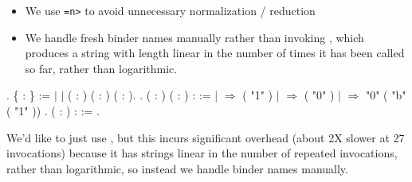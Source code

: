\begin{itemize}
\item  We use \verb|=n>| to avoid unnecessary normalization /
      reduction



\item  We handle fresh binder names manually rather than invoking
      , which produces a string with length
      linear in the number of times it has been called so far, rather
      than logarithmic. 
\end{itemize}
\begin{coqdoccode}
\coqdocemptyline
\coqdocnoindent
{} .\coqdoceol
\coqdocindent{1.00em}
  \{ : \} :=\coqdoceol
\coqdocindent{1.00em}
\ensuremath{|} \coqdoceol
\coqdocindent{1.00em}
\ensuremath{|}  ( : ) ( : ) ( : ).\coqdoceol
\coqdocnoindent
{} .\coqdoceol
\coqdocemptyline
\coqdocnoindent
{}  ( : ) ( : ) : \coqdoceol
\coqdocindent{1.00em}
:=   \coqdoceol
\coqdocindent{2.50em}
\ensuremath{|}   \ensuremath{\Rightarrow}   ( "1" )\coqdoceol
\coqdocindent{2.50em}
\ensuremath{|}   \ensuremath{\Rightarrow}   ( "0" )\coqdoceol
\coqdocindent{2.50em}
\ensuremath{|}  \ensuremath{\Rightarrow}  "0" ( "b" ( "1" ))\coqdoceol
\coqdocindent{2.50em}
.\coqdoceol
\coqdocnoindent
{}  ( : ) : \coqdoceol
\coqdocindent{1.00em}
:=   .\coqdoceol
\coqdocemptyline
\end{coqdoccode}
We'd like to just use  , but this incurs
    significant overhead (about 2X slower at 27 invocations) because
    it has strings linear in the number of repeated invocations,
    rather than logarithmic, so instead we handle binder names
    manually. 

